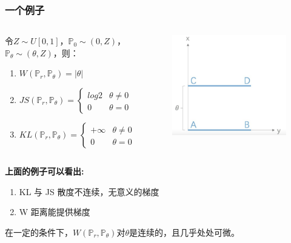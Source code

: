 \documentclass[xelatex]{beamer}
\begin{document}
\begin{frame}
\frametitle{一个例子}
\begin{columns}[t]
  \begin{example}[支撑集不重叠的分布之间的散度]
  令$\mathit{Z} \sim \mathit{U}[0,1]$，$\mathbb{P}_0 \sim (0, \mathit{Z})$，$\mathbb{P}_\theta \sim (\theta, Z)$，则：
  \begin{enumerate}
    \item $\mathit{W}(\mathbb{P}_r , \mathbb{P}_\theta) = |\theta|$
    \item
    $
    JS(\mathbb{P}_r , \mathbb{P}_\theta) =
    \begin{cases}
      log2 & \text{$\theta \neq 0$} \\
      0 & \text{$\theta = 0$}
    \end{cases}
    $
    \item $
    KL(\mathbb{P}_r , \mathbb{P}_\theta) =
    \begin{cases}
      +\infty & \text{$\theta \neq 0$} \\
      0 & \text{$\theta = 0$}
    \end{cases}
    $
  \end{enumerate}
  \end{example}
  \begin{figure}
    \includegraphics[width=0.65\linewidth]{example1}
  \end{figure}
\end{columns}
\textbf{上面的例子可以看出:}
\begin{enumerate}
  \item  KL 与 JS 散度不连续，无意义的梯度
  \item W 距离能提供梯度
\end{enumerate}
\begin{theorem}
  在一定的条件下，$\mathit{W}(\mathbb{P}_r , \mathbb{P}_\theta)$对$\theta$是连续的，且几乎处处可微。
\end{theorem}
\end{frame}
\end{document}
